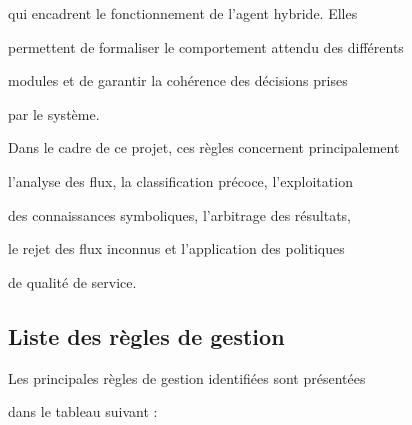 qui encadrent le fonctionnement de l'agent hybride. Elles

permettent de formaliser le comportement attendu des différents

modules et de garantir la cohérence des décisions prises

par le système.



Dans le cadre de ce projet, ces règles concernent principalement

l'analyse des flux, la classification précoce, l'exploitation

des connaissances symboliques, l'arbitrage des résultats,

le rejet des flux inconnus et l'application des politiques

de qualité de service.



\subsection{Liste des règles de gestion}



Les principales règles de gestion identifiées sont présentées

dans le tableau suivant :



